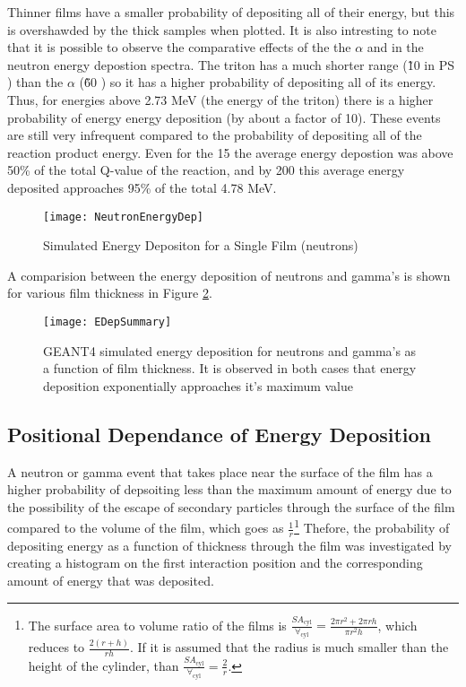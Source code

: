 Thinner films have a smaller probability of depositing all of their energy, but this is overshawded by the thick samples when plotted.
It is also intresting to note that it is possible to observe the comparative effects of the the $\alpha$ and  in the neutron energy depostion spectra. 
The triton has a much shorter range (\~ 10 \micron in PS \cite{kudo_recoil_1980}) than the $\alpha$ (\~ 60 \micron) so it has a higher probability of depositing all of its energy.
Thus, for energies above 2.73 MeV (the energy of the triton) there is a higher probability of energy energy deposition (by about a factor of 10). These events are still very infrequent compared to the probability of depositing all of the reaction product energy.
Even for the 15 \micron the average energy depostion was above 50\% of the total Q-value of the reaction, and by 200 \micron this average energy deposited approaches 95\% of the total 4.78 MeV.
\begin{figure}[h]
    \texttt{[image: NeutronEnergyDep]}
	\caption{Simulated Energy Depositon for a Single Film (neutrons)}
    \label{fig:SimEDepNeutron}
\end{figure}
A comparision between the energy deposition of neutrons and gamma's is shown for various film thickness in Figure \ref{fig:SimEDepNGComparison}.
\begin{figure}
  \texttt{[image: EDepSummary]}
  \caption[Comparison of Neutron and Gamma Energy Depostion]{GEANT4 simulated energy deposition for neutrons and gamma's as a function of film thickness.  It is observed in both cases that energy deposition exponentially approaches it's maximum value}
  \label{fig:SimEDepNGComparison}
\end{figure}

\subsection{Positional Dependance of Energy Deposition}
A neutron or gamma event that takes place near the surface of the film has a higher probability of depsoiting less than the maximum amount of energy due to the possibility of the escape of secondary particles through the surface of the film compared to the volume of the film, which goes as $\frac{1}{r}$\footnote{%
The surface area to volume ratio of the films is $\frac{SA_\text{cyl}}{\forall_\text{cyl}} = \frac{2\pi r^2+2\pi rh}{\pi r^2 h}$, which reduces to $\frac{2(r +h)}{rh}$. 
If it is assumed that the radius is much smaller than the height of the cylinder, than $\frac{SA_\text{cyl}}{\forall_\text{cyl}} = \frac{2}{r}$.
}
Thefore, the probability of depositing energy as a function of thickness through the film was investigated by creating a histogram on the first interaction position and the corresponding amount of energy that was deposited.

